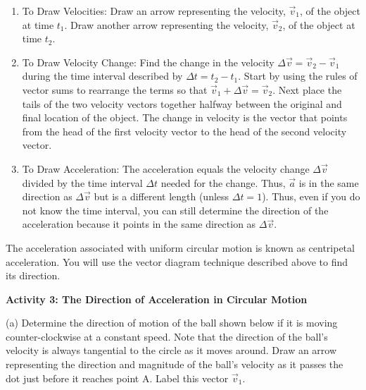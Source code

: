 \begin{enumerate}
\item To Draw Velocities: Draw an arrow representing the velocity, \( {\vec v}_{1} \), of
the object at time \( t_{1} \). Draw another arrow representing the velocity,
\( {\vec v}_{2} \), of the object at time \( t_{2} \). 
\item To Draw Velocity Change: Find the change in the velocity \( \Delta 
{\vec v}
= {\vec v}_{2}  - {\vec v}_{1} \) during the time interval described
by \( \Delta  t = t_{2} - t_{1} \). Start by using the rules of
vector sums to rearrange the terms so that $\vec{ v}_{1} + \Delta {\vec v}
= {\vec v}_{2}$. Next place the tails of the two velocity vectors together
halfway between the original and final location of the object. The change in
velocity is the vector that points from the head of the first velocity vector
to the head of the second velocity vector. 
\item To Draw Acceleration: The acceleration equals the velocity change 
\( \Delta  \vec{v}\)
divided by the time interval $\Delta t$ needed for the change. Thus, $\vec{a}$ is in
the same direction as \( \Delta  \vec{v}\) but is a different length (unless
 \( \Delta  t = 1\)). Thus, even if you do not know the time interval, you
can still determine the direction of the acceleration because it points in the
same direction as \( \Delta  \)$\vec{v}$. 
\end{enumerate}
The acceleration associated with uniform circular motion is known as centripetal
acceleration. You will use the vector diagram technique described above to find
its direction. 

\pagebreak[2]
\textbf{Activity 3: The Direction of Acceleration in Circular Motion}

(a) Determine the direction of motion of the ball shown below if it is moving
counter-clockwise at a constant speed. Note that the direction of the ball's
velocity is always tangential to the circle as it moves around. Draw an arrow
representing the direction and magnitude of the ball's velocity as it passes
the dot just before it reaches point A. Label this vector $\vec{v}_{1}$. 

